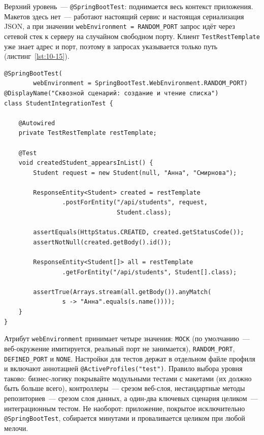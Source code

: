 Верхний уровень~--- \texttt{@SpringBootTest}: поднимается весь контекст приложения. Макетов здесь нет~--- работают настоящий сервис и настоящая сериализация JSON, а при значении \texttt{webEnvironment = RANDOM\_PORT} запрос идёт через сетевой стек к серверу на случайном свободном порту. Клиент \texttt{TestRestTemplate} уже знает адрес и порт, поэтому в запросах указывается только путь (листинг~\ref{lst:10-15}).

\begin{listing}[H]
\begin{verbatim}
@SpringBootTest(
        webEnvironment = SpringBootTest.WebEnvironment.RANDOM_PORT)
@DisplayName("Сквозной сценарий: создание и чтение списка")
class StudentIntegrationTest {

    @Autowired
    private TestRestTemplate restTemplate;

    @Test
    void createdStudent_appearsInList() {
        Student request = new Student(null, "Анна", "Смирнова");

        ResponseEntity<Student> created = restTemplate
                .postForEntity("/api/students", request,
                               Student.class);

        assertEquals(HttpStatus.CREATED, created.getStatusCode());
        assertNotNull(created.getBody().id());

        ResponseEntity<Student[]> all = restTemplate
                .getForEntity("/api/students", Student[].class);

        assertTrue(Arrays.stream(all.getBody()).anyMatch(
                s -> "Анна".equals(s.name())));
    }
}
\end{verbatim}
\caption{Интеграционный тест всего приложения}
\label{lst:10-15}
\end{listing}

Атрибут \texttt{webEnvironment} принимает четыре значения: \texttt{MOCK} (по умолчанию~--- веб-окружение имитируется, реальный порт не занимается), \texttt{RANDOM\_PORT}, \texttt{DEFINED\_PORT} и \texttt{NONE}. Настройки для тестов держат в отдельном файле профиля и включают аннотацией \texttt{@ActiveProfiles("test")}. Правило выбора уровня таково: бизнес-логику покрывайте модульными тестами с макетами (их должно быть больше всего), контроллеры~--- срезом веб-слоя, нестандартные методы репозиториев~--- срезом слоя данных, а один-два ключевых сценария целиком~--- интеграционным тестом. Не наоборот: приложение, покрытое исключительно \texttt{@SpringBootTest}, собирается минутами и проваливается целиком при любой мелочи.

